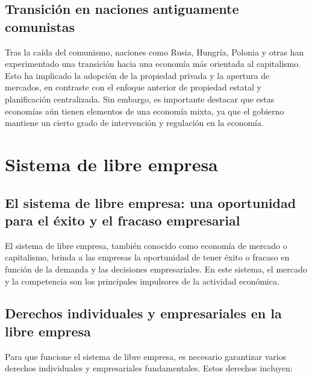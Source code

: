 \documentclass[
  letterpaper,
  DIV=11,
  numbers=noendperiod]{scrartcl}
\begin{document}
\hypertarget{transiciuxf3n-en-naciones-antiguamente-comunistas}{%
\subsection{Transición en naciones antiguamente
comunistas}\label{transiciuxf3n-en-naciones-antiguamente-comunistas}}

Tras la caída del comunismo, naciones como Rusia, Hungría, Polonia y
otras han experimentado una transición hacia una economía más orientada
al capitalismo. Esto ha implicado la adopción de la propiedad privada y
la apertura de mercados, en contraste con el enfoque anterior de
propiedad estatal y planificación centralizada. Sin embargo, es
importante destacar que estas economías aún tienen elementos de una
economía mixta, ya que el gobierno mantiene un cierto grado de
intervención y regulación en la economía.

\hypertarget{sistema-de-libre-empresa}{%
\section{Sistema de libre empresa}\label{sistema-de-libre-empresa}}

\hypertarget{el-sistema-de-libre-empresa-una-oportunidad-para-el-uxe9xito-y-el-fracaso-empresarial}{%
\subsection{El sistema de libre empresa: una oportunidad para el éxito y
el fracaso
empresarial}\label{el-sistema-de-libre-empresa-una-oportunidad-para-el-uxe9xito-y-el-fracaso-empresarial}}

El sistema de libre empresa, también conocido como economía de mercado o
capitalismo, brinda a las empresas la oportunidad de tener éxito o
fracaso en función de la demanda y las decisiones empresariales. En este
sistema, el mercado y la competencia son los principales impulsores de
la actividad económica.

\hypertarget{derechos-individuales-y-empresariales-en-la-libre-empresa}{%
\subsection{Derechos individuales y empresariales en la libre
empresa}\label{derechos-individuales-y-empresariales-en-la-libre-empresa}}

Para que funcione el sistema de libre empresa, es necesario garantizar
varios derechos individuales y empresariales fundamentales. Estos
derechos incluyen:
\end{document}
